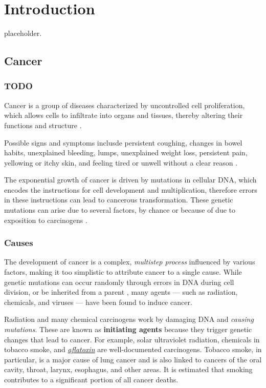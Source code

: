 \chapter{Introduction} \label{chap:introduction}

placeholder. 

\section{Cancer}

\subsection{TODO}

Cancer is a group of diseases characterized by uncontrolled cell proliferation, which allows cells to infiltrate into organs and tissues, thereby altering their functions and structure \cite{cancer1}.

Possible signs and symptoms inclusde persistent coughing, changes in bowel habits, unexplained bleeding, lumps, unexplained weight loss, persistent pain, yellowing or itchy skin, and feeling tired or unwell without a clear reason \cite{cancer3}.

The exponential growth of cancer is driven by mutations in cellular DNA, which encodes the instructions for cell development and multiplication, therefore errors in these instructions can lead to cancerous transformation. These genetic mutations can arise due to several factors, by chance or because of due to exposition to carcinogens \cite{cancer2}. 

\subsection{Causes}

The development of cancer is a complex, \textit{multistep process} influenced by various factors, making it too simplistic to attribute cancer to a single cause. While genetic mutations can occur randomly through errors in DNA during cell division, or be inherited from a parent \cite{cancer2}, many agents --- such as radiation, chemicals, and viruses --- have been found to induce cancer.

Radiation and many chemical carcinogens work by damaging DNA and \textit{causing mutations}. These are known as \textbf{initiating agents} because they trigger genetic changes that lead to cancer. For example, solar ultraviolet radiation, chemicals in tobacco smoke, and \href{https://en.wikipedia.org/wiki/Aflatoxin}{\textit{aflatoxin}} are well-documented carcinogens. Tobacco smoke, in particular, is a major cause of lung cancer and is also linked to cancers of the oral cavity, throat, larynx, esophagus, and other areas. It is estimated that smoking contributes to a significant portion of all cancer deaths.

